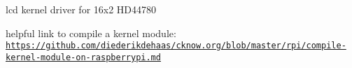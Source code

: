 lcd kernel driver for 16x2 H\+D44780

helpful link to compile a kernel module\+: \href{https://github.com/diederikdehaas/cknow.org/blob/master/rpi/compile-kernel-module-on-raspberrypi.md}{\tt https\+://github.\+com/diederikdehaas/cknow.\+org/blob/master/rpi/compile-\/kernel-\/module-\/on-\/raspberrypi.\+md} 